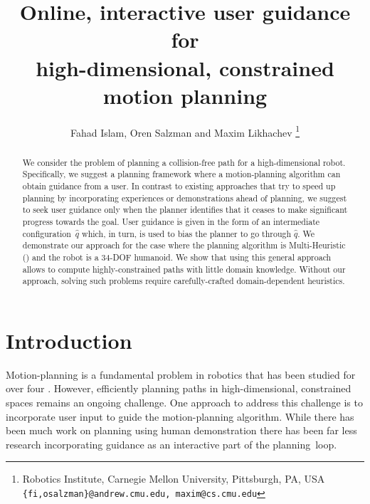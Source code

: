 \documentclass{article}
\title{	Online, interactive user guidance for \\
		high-dimensional, constrained motion planning }
\author{Fahad Islam, Oren Salzman and Maxim Likhachev%
  \thanks{Robotics Institute, Carnegie Mellon University, Pittsburgh, PA, USA
    {\tt\small \{fi,osalzman\}@andrew.cmu.edu, maxim@cs.cmu.edu}
  }%
}
\begin{document}
\maketitle
\thispagestyle{empty}
\pagestyle{empty}


\begin{abstract}
We consider the problem of planning a collision-free path for a high-dimensional robot.
Specifically, we suggest a planning framework where a motion-planning algorithm can obtain guidance from a user.
In contrast to existing approaches that try to speed up planning by incorporating experiences or demonstrations ahead of planning, 
we suggest to seek user guidance only when the planner identifies that it ceases to make significant progress towards the goal.
User guidance is given in the form of an intermediate configuration~$\hat{q}$ which, in turn, is used to bias the planner to go through $\hat{q}$.
We demonstrate our approach for the case where the planning algorithm is Multi-Heuristic \astar (\mhastar) and the robot is a 34-DOF humanoid.
We show that using this general approach allows to compute highly-constrained paths with little domain knowledge.
Without our approach, solving such problems require carefully-crafted domain-dependent heuristics. 
\end{abstract}



\section{Introduction}
\label{sec:intro}

Motion-planning is a fundamental problem in robotics that has been studied for over four .
However, efficiently planning paths in high-dimensional, constrained spaces remains an ongoing challenge.
One approach to address this challenge is to incorporate user input to guide the motion-planning algorithm.
While there has been much work on planning using human demonstration 
there has been far less research incorporating guidance as an interactive part of the planning~loop.
\end{document}
